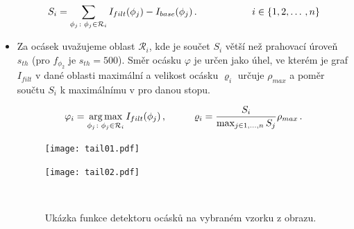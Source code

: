 \begin{itemize}
	\begin{equation}
	S_i = \sum_{\phi_j \colon \phi_j \in \mathcal{R}_i}I_{filt}(\phi_j)-I_{base}(\phi_j)\,. \hspace*{2cm} i \in \left\lbrace 1, 2, \dots \,, n \right\rbrace
	\label{eq:Rsuma}
	\end{equation}
	
	\item Za ocásek uvažujeme oblast $\mathcal{R}_i$, kde je součet $S_i$ větší než prahovací úroveň $s_{th}$ (pro $f_{\phi_2}$ je $s_{th} = 500$). Směr ocásku $\varphi$ je určen jako úhel, ve kterém je graf $I_{filt}$ v dané oblasti maximální a velikost ocásku $\varrho_i$ určuje $\rho_{max}$ a poměr součtu $S_i$ k maximálnímu v pro danou stopu.  
	
	\begin{equation}
	\varphi_i = \operatorname*{arg\,max}_{\phi_j \colon \phi_j \in \mathcal{R}_i}I_{filt}(\phi_j) \,, \hspace{1cm} \varrho_i = \frac{S_i}{\max_{j \in 1,\dots , n}S_j}\rho_{max}\,.
	\label{eq:tail_params}
	\end{equation}
		
	\begin{figure}[htbp]
    \centering
    \begin{minipage}[c]{0.48\textwidth}
        \centering\texttt{[image: tail01.pdf]}
    \end{minipage}
    \begin{minipage}[c]{0.48\textwidth}
        \centering\texttt{[image: tail02.pdf]}
    \end{minipage}
    \\
        \caption[Detektor ocásků - příklad detekce.]{Ukázka funkce detektoru ocásků na vybraném vzorku z obrazu. }
        \label{Detekce}
\end{figure}
	
\end{itemize}	   
	
	


